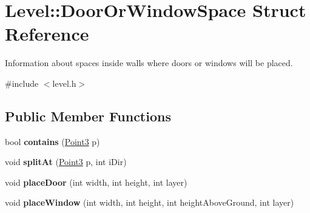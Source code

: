 \hypertarget{structLevel_1_1DoorOrWindowSpace}{
\section{\-Level\-:\-:\-Door\-Or\-Window\-Space \-Struct \-Reference}
\label{db/d7a/structLevel_1_1DoorOrWindowSpace}
}


\-Information about spaces inside walls where doors or windows will be placed.  




{\ttfamily \#include $<$level.\-h$>$}

\subsection*{\-Public \-Member \-Functions}
\begin{DoxyCompactItemize}
\item 
\hypertarget{structLevel_1_1DoorOrWindowSpace_a71cd8ac691cb9cfebd33927d23118170}{
bool {\bfseries contains} (\hyperlink{classPoint3}{\-Point3} p)}
\label{db/d7a/structLevel_1_1DoorOrWindowSpace_a71cd8ac691cb9cfebd33927d23118170}

\item 
\hypertarget{structLevel_1_1DoorOrWindowSpace_aea09125d65a5d3345a99e7faaf6adbcc}{
void {\bfseries split\-At} (\hyperlink{classPoint3}{\-Point3} p, int i\-Dir)}
\label{db/d7a/structLevel_1_1DoorOrWindowSpace_aea09125d65a5d3345a99e7faaf6adbcc}

\item 
\hypertarget{structLevel_1_1DoorOrWindowSpace_a6ca69da5179af7851a8f7445a4ff0b19}{
void {\bfseries place\-Door} (int width, int height, int layer)}
\label{db/d7a/structLevel_1_1DoorOrWindowSpace_a6ca69da5179af7851a8f7445a4ff0b19}

\item 
\hypertarget{structLevel_1_1DoorOrWindowSpace_aefcd3b6dba7b86b42076980f399e0dcc}{
void {\bfseries place\-Window} (int width, int height, int height\-Above\-Ground, int layer)}
\label{db/d7a/structLevel_1_1DoorOrWindowSpace_aefcd3b6dba7b86b42076980f399e0dcc}

\end{DoxyCompactItemize}
